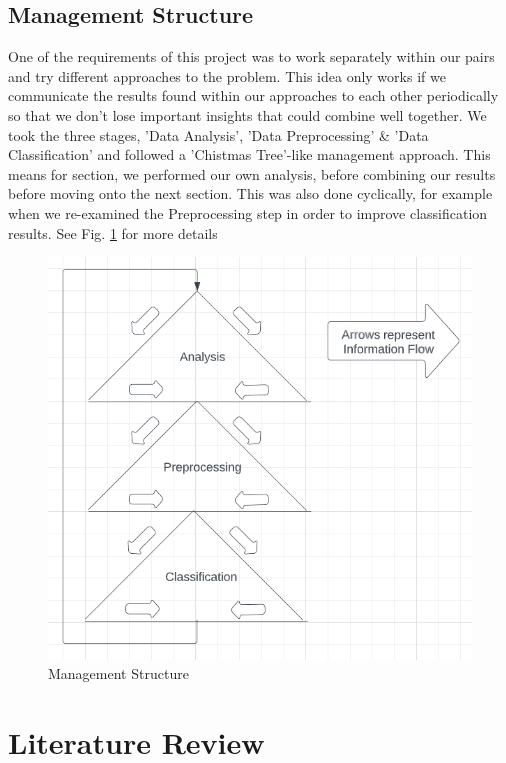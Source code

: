 \documentclass[conference]{IEEEtran}
\begin{document}
\subsection{Management Structure}

One of the requirements of this project was to work separately within our pairs and try different approaches to the problem. This idea only works if we communicate the results found within our approaches to each other periodically so that we don't lose important insights that could combine well together. We took the three stages, 'Data Analysis', 'Data Preprocessing' \& 'Data Classification' and followed a 'Chistmas Tree'-like management approach. This means for section, we performed our own analysis, before combining our results before moving onto the next section. This was also done cyclically, for example when we re-examined the Preprocessing step in order to improve classification results. See Fig. \ref{fig:management_structure} for more details

\begin{figure}[h]
    \centering
    \includegraphics[scale=0.35]{figures/ct_approach.png}
    \caption{Management Structure}
    \label{fig:management_structure}
\end{figure}

\section{Literature Review}
\end{document}
